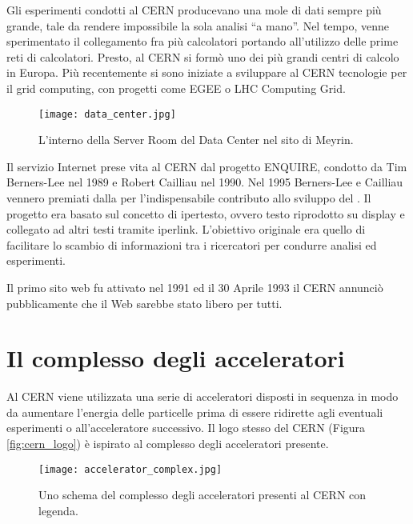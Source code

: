 			Gli esperimenti condotti al \ac{CERN} producevano una mole di dati sempre più grande, tale da rendere impossibile la sola analisi ``a mano''. Nel tempo, venne sperimentato il collegamento fra più calcolatori portando all'utilizzo delle prime reti di calcolatori. Presto, al \ac{CERN} si formò uno dei più grandi centri di calcolo in Europa. Più recentemente si sono iniziate a sviluppare al \ac{CERN} tecnologie per il grid computing, con progetti come \ac{EGEE} o LHC Computing Grid.
			
			\begin{figure}[h!]
				\begin{center}
					\texttt{[image: data\_center.jpg]}
				\end{center}
				\caption[Server Room del Data Center]{L'interno della Server Room del Data Center nel sito di Meyrin.}
				\label{fig:data_center}
			\end{figure}
			
			Il servizio Internet  prese vita al \ac{CERN} dal progetto ENQUIRE, condotto da Tim Berners-Lee nel 1989 e Robert Cailliau nel 1990. Nel 1995 Berners-Lee e Cailliau vennero premiati dalla  per l'indispensabile contributo allo sviluppo del . Il progetto era basato sul concetto di ipertesto, ovvero testo riprodotto su display e collegato ad altri testi tramite iperlink. L'obiettivo originale era quello di facilitare lo scambio di informazioni tra i ricercatori per condurre analisi ed esperimenti.
			
			Il primo sito web fu attivato nel 1991 ed il 30 Aprile 1993 il \ac{CERN} annunciò pubblicamente che il Web sarebbe stato libero per tutti.
			
	\section{Il complesso degli acceleratori} \label{sec:C;acceleratori}
	
		Al \ac{CERN} viene utilizzata una serie di acceleratori disposti in sequenza in modo da aumentare l'energia delle particelle prima di essere ridirette agli eventuali esperimenti o all'acceleratore successivo. Il logo stesso del \ac{CERN} (Figura \ref{fig:cern_logo}) è ispirato al complesso degli acceleratori presente.
			
		\begin{figure}[h!]
			\begin{center}
				\texttt{[image: accelerator\_complex.jpg]}
			\end{center}
			\caption[Complesso degli acceleratori]{Uno schema del complesso degli acceleratori presenti al CERN con legenda.}
			\label{fig:accelerator_complex}
		\end{figure}
		
